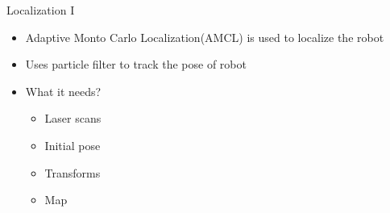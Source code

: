 \begin{frame}{Localization I}
    \begin{itemize}
        \item Adaptive Monto Carlo Localization(AMCL) is used to localize the robot
        \item Uses particle filter to track the pose of robot
        \item What it needs?
        \begin{itemize}
            \item Laser scans
            \item Initial pose
            \item Transforms
            \item Map 
        \end{itemize}
    \end{itemize}
\end{frame}
